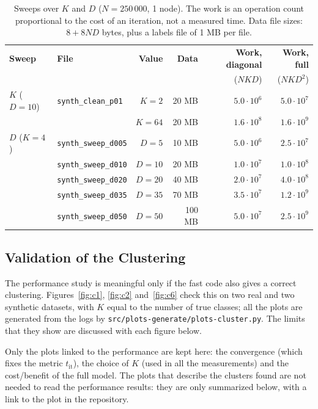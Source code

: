 \documentclass[conference,onecolumn]{IEEEtran}
\begin{document}
\begin{table}[H]
\centering
\caption{Sweeps over $K$ and $D$ ($N=250\,000$, 1 node). The work is an operation count proportional to the cost of an iteration, not a measured time. Data file sizes: $8+8ND$ bytes, plus a labels file of 1 MB per file.}
\label{tab:sweeps}
\footnotesize
\setlength{\tabcolsep}{4pt}
\begin{tabular}{llrrrr}
\toprule
\textbf{Sweep} & \textbf{File} & \textbf{Value} & \textbf{Data} & \textbf{Work, diagonal} & \textbf{Work, full} \\
 & & & & ($NKD$) & ($NKD^2$) \\
\midrule
$K$ ($D=10$) & \texttt{synth\_clean\_p01} & $K=2$  & 20 MB & $5.0\cdot10^6$ & $5.0\cdot10^7$ \\
             &                            & $K=64$ & 20 MB & $1.6\cdot10^8$ & $1.6\cdot10^9$ \\
\midrule
$D$ ($K=4$)  & \texttt{synth\_sweep\_d005} & $D=5$  & 10 MB  & $5.0\cdot10^6$ & $2.5\cdot10^7$ \\
             & \texttt{synth\_sweep\_d010} & $D=10$ & 20 MB  & $1.0\cdot10^7$ & $1.0\cdot10^8$ \\
             & \texttt{synth\_sweep\_d020} & $D=20$ & 40 MB  & $2.0\cdot10^7$ & $4.0\cdot10^8$ \\
             & \texttt{synth\_sweep\_d035} & $D=35$ & 70 MB  & $3.5\cdot10^7$ & $1.2\cdot10^9$ \\
             & \texttt{synth\_sweep\_d050} & $D=50$ & 100 MB & $5.0\cdot10^7$ & $2.5\cdot10^9$ \\
\bottomrule
\end{tabular}
\end{table}

\subsection{Validation of the Clustering}\label{sec:validation}
The performance study is meaningful only if the fast code also gives a correct clustering. Figures~\ref{fig:c1}, \ref{fig:c2} and~\ref{fig:c6} check this on two real and two synthetic datasets, with $K$ equal to the number of true classes; all the plots are generated from the logs by \texttt{src/plots-generate/plots-cluster.py}. The limits that they show are discussed with each figure below.

Only the plots linked to the performance are kept here: the convergence (which fixes the metric $t_{\mathrm{it}}$), the choice of $K$ (used in all the measurements) and the cost/benefit of the full model. The plots that describe the clusters found are not needed to read the performance results: they are only summarized below, with a link to the plot in the repository.
\end{document}
